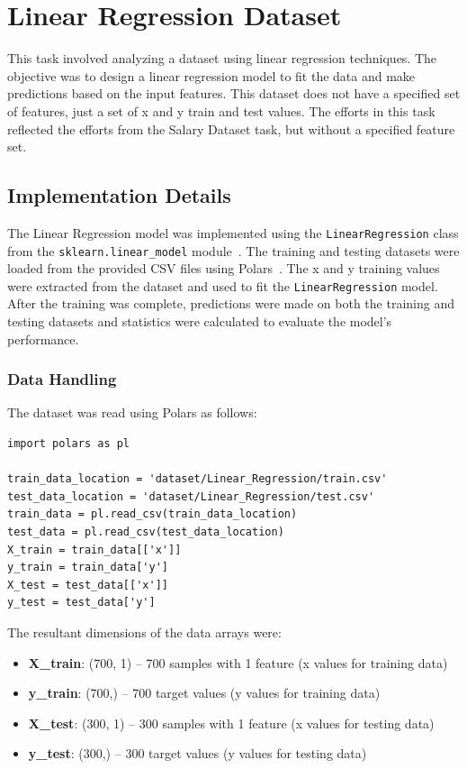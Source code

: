 \section{Linear Regression Dataset}
This task involved analyzing a dataset using linear regression techniques. 
The objective was to design a linear regression model to fit the data and make predictions based on the input features. 
This dataset does not have a specified set of features, just a set of x and y train and test values. 
The efforts in this task reflected the efforts from the Salary Dataset task, but without a specified feature set.

\subsection{Implementation Details}
The Linear Regression model was implemented using the \texttt{LinearRegression} class from the \texttt{sklearn.linear\_model} module~\cite{sklearn_linear_model}.
The training and testing datasets were loaded from the provided CSV files using Polars~\cite{polars}. 
The x and y training values were extracted from the dataset and used to fit the \texttt{LinearRegression} model.
After the training was complete, predictions were made on both the training and testing datasets and statistics were calculated to evaluate the model's performance.

\newpage
\subsubsection{Data Handling}
The dataset was read using Polars as follows:
\begin{verbatim}
import polars as pl

train_data_location = 'dataset/Linear_Regression/train.csv'
test_data_location = 'dataset/Linear_Regression/test.csv'
train_data = pl.read_csv(train_data_location)
test_data = pl.read_csv(test_data_location)
X_train = train_data[['x']]
y_train = train_data['y']
X_test = test_data[['x']]
y_test = test_data['y']
\end{verbatim}

\noindent The resultant dimensions of the data arrays were:
\begin{itemize}
    \item \textbf{X\_train}: (700, 1) -- 700 samples with 1 feature (x values for training data)
    \item \textbf{y\_train}: (700,) -- 700 target values (y values for training data)
    \item \textbf{X\_test}: (300, 1) -- 300 samples with 1 feature (x values for testing data)
    \item \textbf{y\_test}: (300,) -- 300 target values (y values for testing data)
\end{itemize}

